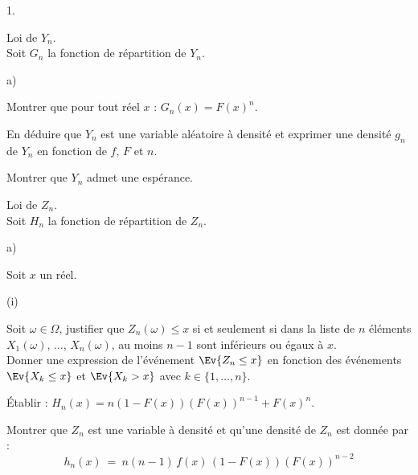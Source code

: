 \documentclass[11pt]{article}%
\begin{document}
\begin{noliste}{1.}
  \setlength{\itemsep}{4mm}
  \item Loi de $Y_n$.\\
  Soit $G_n$ la fonction de répartition de $Y_n$.
  \begin{noliste}{a)}
    \setlength{\itemsep}{2mm}
    \item Montrer que pour tout réel $x$ : $G_n(x)=F(x)^n$.
    
    
    
    

    
    \item En déduire que $Y_n$ est une variable aléatoire à densité 
    et exprimer une densité $g_n$ de $Y_n$ en fonction de $f$, $F$
    et $n$.
    
    

    
    \item Montrer que $Y_n$ admet une espérance.
    
    
  \end{noliste}
  
  
  
  
  \item Loi de $Z_n$.\\
  Soit $H_n$ la fonction de répartition de $Z_n$.
  \begin{noliste}{a)}
    \setlength{\itemsep}{2mm}
    \item Soit $x$ un réel.
    \begin{nonoliste}{(i)}
      \item Soit $\omega \in \Omega$, justifier que $Z_n(\omega) \leq x$
      si et seulement si dans la liste de $n$ éléments $X_1(\omega)$,
      $\ldots$, $X_n(\omega)$, au moins $n-1$ sont inférieurs ou égaux
      à $x$.\\
      Donner une expression de l'événement $\Ev{Z_n \leq x}$ en 
      fonction des événements $\Ev{X_k \leq x}$ et $\Ev{X_k >x}$ avec
      $k \in \{1, \ldots, n \}$.
      
      
      
      

      
      \item Établir : $H_n(x) = n(1-F(x))(F(x))^{n-1} + F(x)^n$.
      
      

    \end{nonoliste}
    
    \item Montrer que $Z_n$ est une variable à densité et qu'une 
    densité de $Z_n$ est donnée par :
    \[
      h_n(x) \ = \ n(n-1) \, f(x) \, (1-F(x))(F(x))^{n-2}
    \]
    

\end{noliste}
\end{noliste}
\end{document}

